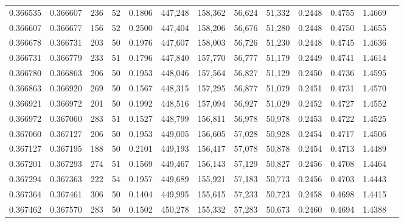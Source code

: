 \begin{tabular}{rrrrrrrrrrrrr}
0.366535 & 0.366607 &   236 &  52 &                                     0.1806 & 447,248 & 158,362 &  56,624 &  51,332 & 0.2448 & 0.4755 & 1.4669 \\
0.366607 & 0.366677 &   156 &  52 &                                     0.2500 & 447,404 & 158,206 &  56,676 &  51,280 & 0.2448 & 0.4750 & 1.4655 \\
0.366678 & 0.366731 &   203 &  50 &                                     0.1976 & 447,607 & 158,003 &  56,726 &  51,230 & 0.2448 & 0.4745 & 1.4636 \\
0.366731 & 0.366779 &   233 &  51 &                                     0.1796 & 447,840 & 157,770 &  56,777 &  51,179 & 0.2449 & 0.4741 & 1.4614 \\
0.366780 & 0.366863 &   206 &  50 &                                     0.1953 & 448,046 & 157,564 &  56,827 &  51,129 & 0.2450 & 0.4736 & 1.4595 \\
0.366863 & 0.366920 &   269 &  50 &                                     0.1567 & 448,315 & 157,295 &  56,877 &  51,079 & 0.2451 & 0.4731 & 1.4570 \\
0.366921 & 0.366972 &   201 &  50 &                                     0.1992 & 448,516 & 157,094 &  56,927 &  51,029 & 0.2452 & 0.4727 & 1.4552 \\
0.366972 & 0.367060 &   283 &  51 &                                     0.1527 & 448,799 & 156,811 &  56,978 &  50,978 & 0.2453 & 0.4722 & 1.4525 \\
0.367060 & 0.367127 &   206 &  50 &                                     0.1953 & 449,005 & 156,605 &  57,028 &  50,928 & 0.2454 & 0.4717 & 1.4506 \\
0.367127 & 0.367195 &   188 &  50 &                                     0.2101 & 449,193 & 156,417 &  57,078 &  50,878 & 0.2454 & 0.4713 & 1.4489 \\
0.367201 & 0.367293 &   274 &  51 &                                     0.1569 & 449,467 & 156,143 &  57,129 &  50,827 & 0.2456 & 0.4708 & 1.4464 \\
0.367294 & 0.367363 &   222 &  54 &                                     0.1957 & 449,689 & 155,921 &  57,183 &  50,773 & 0.2456 & 0.4703 & 1.4443 \\
0.367364 & 0.367461 &   306 &  50 &                                     0.1404 & 449,995 & 155,615 &  57,233 &  50,723 & 0.2458 & 0.4698 & 1.4415 \\
0.367462 & 0.367570 &   283 &  50 &                                     0.1502 & 450,278 & 155,332 &  57,283 &  50,673 & 0.2460 & 0.4694 & 1.4388 \\

\end{tabular}
